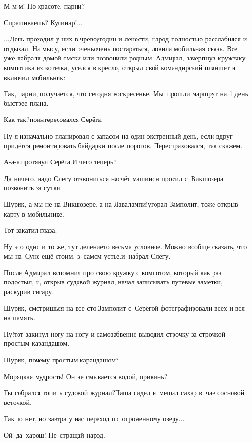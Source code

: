 \diagdash М-м-м! По красоте, парни?

\diagdash Спрашиваешь? Кулинар!$\ldots$

$\ldots$День проходил у них в чревоугодии и лености, народ полностью расслабился и отдыхал. На мысу, если очень\sdash очень  постараться, ловила мобильная связь. Все уже набрали домой смс\sdash ки или позвонили родным. Адмирал, зачерпнув кружечку компотика из котелка, уселся в кресло, открыл свой командирский планшет и включил мобильник:

\diagdash Так, парни, получается, что сегодня воскресенье. Мы~прошли маршрут на 1 день быстрее плана.

\diagdash Как так?\mdash поинтересовался Серёга.

\diagdash Ну я изначально планировал с запасом на один экстренный день, если вдруг придётся ремонтировать байдарки после порогов. Перестраховался, так скажем.

\diagdash А-а-а.\mdash протянул Серёга.\mdash И чего теперь?

\diagdash Да ничего, надо Олегу отзвониться насчёт машин\mdash он просил с~Викшозера позвонить за сутки.

\diagdash Шурик, а мы не на Викшозере, а на Лавалампи!\mdash угорал Замполит, тоже открыв карту в мобильнике.

Тот закатил глаза:

\diagdash Ну это одно и то же, тут деление\sdash то весьма условное. Можно вообще сказать, что мы на~Суне ещё стоим, в~самом устье.\mdash и~набрал Олегу.

После Адмирал вспомнил про свою кружку с компотом, который как раз подостыл, и, открыв судовой журнал, начал записывать путевые заметки, раскурив сигару.

\diagdash Шурик, смотришься на все сто.\mdash Замполит с~Серёгой фотографировали всех и вся на память.

\diagdash Ну!\mdash тот закинул ногу на ногу и самозабвенно выводил строчку за строчкой простым карандашом.

\diagdash Шурик, почему простым карандашом?

\diagdash Моряцкая мудрость! Он не смывается водой, прикинь?

\diagdash Ты собрался топить судовой журнал?\mdash Паша сидел и~мешал сахар в~чае сосновой веточкой.

\diagdash Так то нет, но завтра у нас переход по~огроменному озеру$\ldots$

\diagdash Ой~да~харош! Не~стращай народ.


